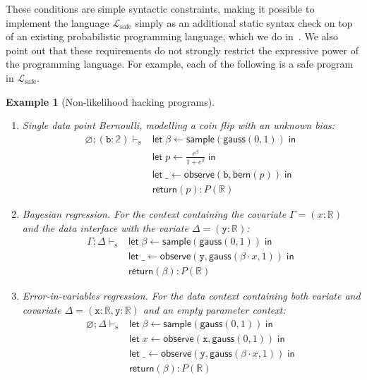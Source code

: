 \documentclass[preprint]{uai2026} %
\newtheorem{example}{Example}
\newcommand{\emptyctx}{\varnothing}
\newcommand{\unittype}{\mathbb{1}}
\newcommand{\RR}{\mathbb{R}}
\newcommand{\Bool}{\mathbb{2}}
\newcommand{\Lsafe}{\mathcal{L}_{\text{safe}}}
\newcommand{\safevdash}{\vdash_{\text{s}}}
\newcommand{\letbind}[3]{\mathsf{let}\;#1\leftarrow #2\;\mathsf{in}\;#3}
\newcommand{\seq}[2]{\letbind{\_}{#1}{#2}}
\newcommand{\gauss}[2]{\mathsf{gauss}(#1,#2)}
\newcommand{\bern}[1]{\mathsf{bern}(#1)}
\newcommand{\return}[1]{\mathsf{return}(#1)}
\newcommand{\sample}[1]{\mathsf{sample}(#1)}
\newcommand{\observe}[2]{\mathsf{observe}(#1,#2)}
\newcommand{\datavar}[1]{\mathtt{#1}}
\begin{document}
These conditions are simple syntactic constraints, making it possible to implement the language $\Lsafe$ simply as an additional static syntax check on top of an existing probabilistic programming language, which we do in~. We also point out that these requirements do not strongly restrict the expressive power of the programming language. For example, each of the following is a safe program in $\Lsafe$.

\begin{example}[Non-likelihood hacking programs]\hspace{2cm}
\begin{enumerate}[left=0pt,nosep]
\item Single data point Bernoulli, modelling a coin flip with an unknown bias:
\begin{align*}
\emptyctx;(\datavar{b}:\Bool) \safevdash
    &\letbind{\beta}{\sample{\gauss{0}{1}}}{ \\
    &\letbind{p}{\frac{e^\beta}{1 + e^\beta}}{ \\
    &\seq{\observe{\datavar{b}}{\bern{p}}}{\\
    &\return{p}}}}
: P(\RR)
\end{align*}

\item Bayesian regression. For the context containing the covariate $\Gamma=(x:\RR)$ and the data interface with the variate $\Delta=(\datavar{y}:\RR)$:
\begin{align*}
\Gamma;\Delta \safevdash
    &\letbind{\beta}{\sample{\gauss{0}{1}}}{ \\
    &\seq{\observe{\datavar{y}}{\gauss{\beta\cdot x}{1}}}{\\
    &\return{\beta}}}
: P(\RR)
\end{align*}
\item Error-in-variables regression. For the data context containing both variate and covariate $\Delta=(\datavar{x}:\RR,\datavar{y}:\RR)$ and an empty parameter context:
\begin{align*}
\emptyctx;\Delta \safevdash
    &\letbind{\beta}{\sample{\gauss{0}{1}}}{ \\
    &\letbind{x}{\observe{\datavar{x}}{\gauss{0}{1}}}{ \\
    &\seq{\observe{\datavar{y}}{\gauss{\beta\cdot x}{1}}} \\
    &{\return{\beta}}}}
: P(\RR)
\end{align*}
\end{enumerate}
\end{example}
\end{document}
